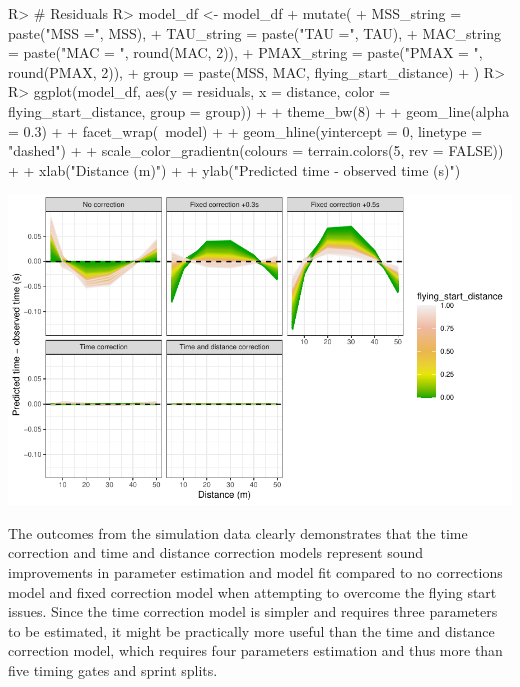 \documentclass[
]{jss}
\begin{document}
\begin{CodeChunk}
\begin{CodeInput}
R> # Residuals
R> model_df <- model_df %
+   mutate(
+     MSS_string = paste("MSS =", MSS),
+     TAU_string = paste("TAU =", TAU),
+     MAC_string = paste("MAC = ", round(MAC, 2)),
+     PMAX_string = paste("PMAX = ", round(PMAX, 2)),
+     group = paste(MSS, MAC, flying_start_distance)
+   )
R> 
R> ggplot(model_df, aes(y = residuals, x = distance, color = flying_start_distance, group = group)) +
+   theme_bw(8) +
+   geom_line(alpha = 0.3) +
+   facet_wrap(~model) +
+   geom_hline(yintercept = 0, linetype = "dashed") +
+   scale_color_gradientn(colours = terrain.colors(5, rev = FALSE)) +
+   xlab("Distance (m)") +
+   ylab("Predicted time - observed time (s)")
\end{CodeInput}


\begin{center}\includegraphics[width=1\linewidth]{paper_files/figure-latex/unnamed-chunk-40-1} \end{center}

\end{CodeChunk}

The outcomes from the simulation data clearly demonstrates that the time correction and time and distance correction models represent sound improvements in parameter estimation and model fit compared to no corrections model and fixed correction model when attempting to overcome the flying start issues. Since the time correction model is simpler and requires three parameters to be estimated, it might be practically more useful than the time and distance correction model, which requires four parameters estimation and thus more than five timing gates and sprint splits.
\end{document}
